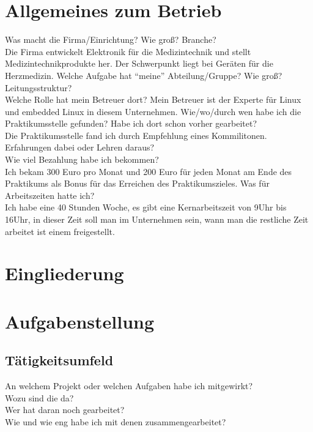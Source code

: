 \documentclass[pdftex,12pt,a4paper]{scrreprt}
\begin{document}

\tableofcontents

\begin{abstract}

\end{abstract}

\section{Allgemeines zum Betrieb}
Was macht die Firma/Einrichtung? Wie groß? Branche?\\
Die Firma entwickelt Elektronik für die Medizintechnik und stellt Medizintechnikprodukte her.
Der Schwerpunkt liegt bei Geräten für die Herzmedizin.
Welche Aufgabe hat "`meine"' Abteilung/Gruppe? Wie groß? Leitungsstruktur?\\
Welche Rolle hat mein Betreuer dort?
Mein Betreuer ist der Experte für Linux und embedded Linux in diesem Unternehmen.
Wie/wo/durch wen habe ich die Praktikumsstelle gefunden? Habe ich dort schon vorher gearbeitet?\\
Die Praktikumsstelle fand ich durch Empfehlung eines Kommilitonen.
Erfahrungen dabei oder Lehren daraus?\\
Wie viel Bezahlung habe ich bekommen?\\
Ich bekam 300 Euro pro Monat und 200 Euro für jeden Monat am Ende des Praktikums als Bonus für das Erreichen des Praktikumszieles.
Was für Arbeitszeiten hatte ich?\\
Ich habe eine 40 Stunden Woche, es gibt eine Kernarbeitszeit von 9Uhr bis 16Uhr, in dieser Zeit soll man im Unternehmen sein,
wann man die restliche Zeit arbeitet ist einem freigestellt.
\section{Eingliederung}
\section{Aufgabenstellung}
\subsection{Tätigkeitsumfeld}
An welchem Projekt oder welchen Aufgaben habe ich mitgewirkt?\\
Wozu sind die da?\\
Wer hat daran noch gearbeitet?\\
Wie und wie eng habe ich mit denen zusammengearbeitet?\\
\end{document}

